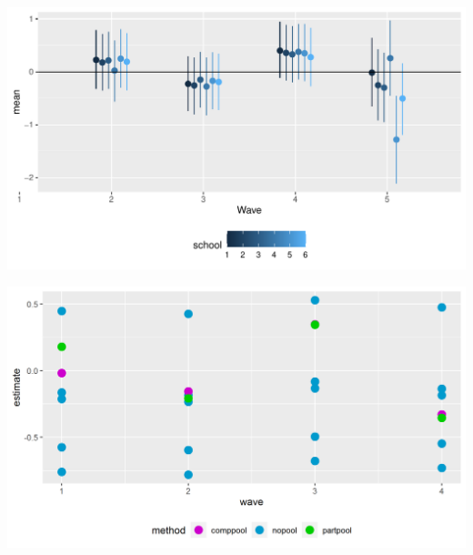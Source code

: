 \documentclass[a4, 12pt]{article}
\begin{document}
\includegraphics[width=1\linewidth]{../figures/lsat_teff_across_schools}

\includegraphics[width=1\linewidth]{../figures/compare_estimates_lsat}
\end{document}
